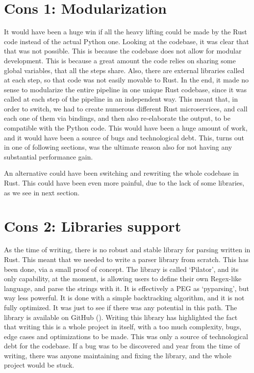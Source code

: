 \section[Modularization]{Cons 1: Modularization}
It would have been a huge win if all the heavy lifting could be made by the Rust
code instead of the actual Python one. Looking at the codebase, it was clear
that that was not possible. This is because the codebase does not allow for modular
development. This is because a great amount the code relies on sharing some
global variables, that all the steps share. Also, there are external libraries called
at each step, so that code was not easily movable to Rust. In the end, it made
no sense to modularize the entire pipeline in one unique Rust codebase, since it
was called at each step of the pipeline in an independent way. This meant that, in
order to switch, we had to create numerous different Rust microservices, and call
each one of them via bindings, and then also re-elaborate the output, to be compatible
with the Python code. This would have been a huge amount of work, and it would have
been a source of bugs and technological debt. This, turns out in one of following
sections, was the ultimate reason also for not having any substantial
performance gain.

An alternative could have been switching and rewriting the whole codebase in
Rust. This could have been even more painful, due to the lack of some libraries,
as we see in next section.

\section[Libraries support]{Cons 2: Libraries support}
As the time of writing, there is no robust and stable library for parsing
written in Rust. This meant that we needed to write a parser library from scratch.
This has been done, via a small proof of concept. The library is called `Pilator',
and its only capability, at the moment, is allowing users to define their own Regex-like
language, and parse the strings with it. It is effectively a PEG as `pyparsing',
but way less powerful. It is done with a simple backtracking algorithm, and it
is not fully optimized. It was just to see if there was any potential in this path.
The library is available on GitHub (\cite{pilator}). Writing this library has highlighted
the fact that writing this is a whole project in itself, with a too much
complexity, bugs, edge cases and optimizations to be made. This was only a source
of technological debt for the codebase. If a bug was to be discovered and year
from the time of writing, there was anyone maintaining and fixing the library,
and the whole project would be stuck.

